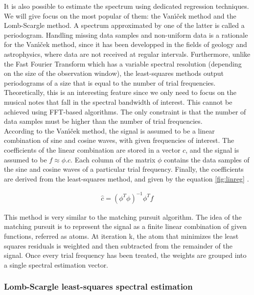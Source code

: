 \documentclass[letterpaper]{article}
\begin{document}
It is also possible to estimate the spectrum using dedicated regression techniques. We will give focus on the most popular of them:
the Van\'{\i}\v{c}ek method and the Lomb-Scargle method. A spectrum approximated by one of the latter is called a periodogram.
Handling missing data samples and non-uniform data is a rationale for the Van\'{\i}\v{c}ek method, since it has been developped in the fields of
geology and astrophysics, where data are not received at regular intervals. Furthermore, unlike the Fast Fourier Transform which has a
variable spectral resolution (depending on the size of the observation window), the least-squares methods output periodograms of a size
that is equal to the number of trial frequencies. Theoretically, this is an interesting feature since we only need to focus on the musical notes that fall in the spectral bandwidth of interest. This cannot be achieved using FFT-based algorithms. The only constraint is that the number of data samples must be higher than the number of trial frequencies.\\

According to the Van\'{\i}\v{c}ek method, the signal is assumed to be a linear combination of sine and cosine waves, with given frequencies of interest.
The coefficients of the linear combination are stored in a vector $c$, and the signal is assumed to be $f \approx \phi.c$. 
Each column of the matrix $\phi$ contains the data samples of the sine and cosine waves of a particular trial frequency.
Finally, the coefficients are derived from the least-squares method, and given by the equation \ref{fig:linreg} \citep{PS}.

\begin{align}
\hat{c} = (\phi^{T} \phi)^{-1} \phi^{T} f
\label{fig:linreg}
\end{align}

This method is very similar to the matching pursuit algorithm. The idea of the matching pursuit is to represent the signal as a finite linear combination of given
functions, referred as atoms. At iteration k, the atom that minimizes the least squares residuals is weighted and then subtracted from 
the remainder of the signal. Once every trial frequency has been treated, the weights are grouped into a single spectral estimation vector.

\subsubsection{Lomb-Scargle least-squares spectral estimation}
\end{document}
